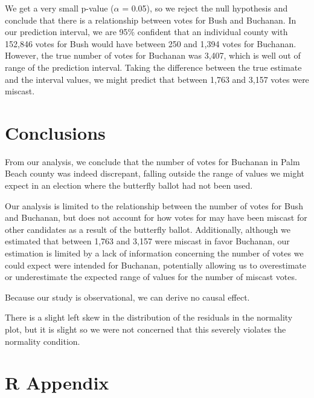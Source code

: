 \documentclass[
  letterpaper,
  DIV=11,
  numbers=noendperiod]{scrartcl}
\begin{document}
We get a very small p-value (\(\alpha\) = 0.05), so we reject the null
hypothesis and conclude that there is a relationship between votes for
Bush and Buchanan. In our prediction interval, we are 95\% confident
that an individual county with 152,846 votes for Bush would have between
250 and 1,394 votes for Buchanan. However, the true number of votes for
Buchanan was 3,407, which is well out of range of the prediction
interval. Taking the difference between the true estimate and the
interval values, we might predict that between 1,763 and 3,157 votes
were miscast.

\section{Conclusions}\label{conclusions}

From our analysis, we conclude that the number of votes for Buchanan in
Palm Beach county was indeed discrepant, falling outside the range of
values we might expect in an election where the butterfly ballot had not
been used.

Our analysis is limited to the relationship between the number of votes
for Bush and Buchanan, but does not account for how votes for may have
been miscast for other candidates as a result of the butterfly ballot.
Additionally, although we estimated that between 1,763 and 3,157 were
miscast in favor Buchanan, our estimation is limited by a lack of
information concerning the number of votes we could expect were intended
for Buchanan, potentially allowing us to overestimate or underestimate
the expected range of values for the number of miscast votes.

Because our study is observational, we can derive no causal effect.

There is a slight left skew in the distribution of the residuals in the
normality plot, but it is slight so we were not concerned that this
severely violates the normality condition.

\section{R Appendix}\label{r-appendix}
\end{document}
